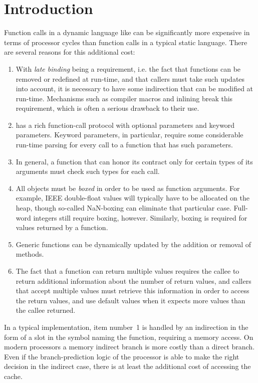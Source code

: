 \section{Introduction}
\label{sec-introduction}

Function calls in a dynamic language like \commonlisp{} can be
significantly more expensive in terms of processor cycles than
function calls in a typical static language.  There are several
reasons for this additional cost:

\begin{enumerate}
\item With \emph{late binding} being a requirement, i.e. the fact that
  functions can be removed or redefined at run-time, and that callers
  must take such updates into account, it is necessary to have some
  indirection that can be modified at run-time.  Mechanisms such as
  compiler macros and inlining break this requirement, which is often
  a serious drawback to their use.
\item \commonlisp{} has a rich function-call protocol with optional
  parameters and keyword parameters.  Keyword parameters, in
  particular, require some considerable run-time parsing for every
  call to a function that has such parameters.
\item In general, a function that can honor its contract only for
  certain types of its arguments must check such types for each call.
\item All objects must be \emph{boxed} in order to be used as function
  arguments.  For example, IEEE double-float values will typically
  have to be allocated on the heap, though so-called NaN-boxing
  \cite{Gudeman93representingtype} can eliminate that particular case.
  Full-word integers still require boxing, however.  Similarly, boxing
  is required for values returned by a function.
\item Generic functions can be dynamically updated by the addition or
  removal of methods.
\item The fact that a function can return multiple values requires the
  callee to return additional information about the number of
  return values, and callers that accept multiple values must retrieve
  this information in order to access the return values, and use
  default values when it expects more values than the callee
  returned.
\end{enumerate}

In a typical \commonlisp{} implementation, item number~1 is handled by
an indirection in the form of a slot in the symbol naming the
function, requiring a memory access.  On modern processors a memory
indirect branch is more costly than a direct branch.  Even if the
branch-prediction logic of the processor is able to make the right
decision in the indirect case, there is at least the additional cost
of accessing the cache.

